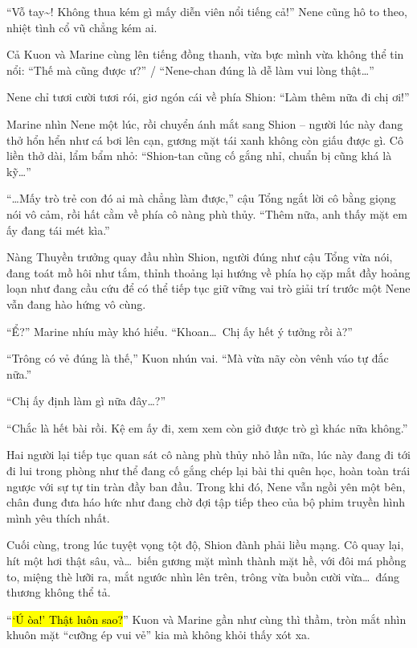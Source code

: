 \documentclass[../main.tex]{subfiles}
\begin{document}
``Vỗ tay\~{}! Không thua kém gì mấy diễn viên nổi tiếng cả!'' Nene cũng hô to theo, nhiệt tình cổ vũ chẳng kém ai.

Cả Kuon và Marine cùng lên tiếng đồng thanh, vừa bực mình vừa không thể tin nổi: ``Thế mà cũng được ư?'' / ``Nene-chan đúng là dễ làm vui lòng thật\dots''

Nene chỉ tươi cười tươi rói, giơ ngón cái về phía Shion: ``Làm thêm nữa đi chị ơi!''

Marine nhìn Nene một lúc, rồi chuyển ánh mắt sang Shion – người lúc này đang thở hổn hển như cá bơi lên cạn, gương mặt tái xanh không còn giấu được gì. Cô liền thở dài, lẩm bẩm nhỏ: ``Shion-tan cũng cố gắng nhỉ, chuẩn bị cũng khá là kỹ\dots''

``\dots Mấy trò trẻ con đó ai mà chẳng làm được,'' cậu Tổng ngắt lời cô bằng giọng nói vô cảm, rồi hất cằm về phía cô nàng phù thủy. ``Thêm nữa, anh thấy mặt em ấy đang tái mét kìa.''

Nàng Thuyền trưởng quay đầu nhìn Shion, người đúng như cậu Tổng vừa nói, đang toát mồ hôi như tắm, thỉnh thoảng lại hướng về phía họ cặp mắt đầy hoảng loạn như đang cầu cứu để có thể tiếp tục giữ vững vai trò giải trí trước một Nene vẫn đang hào hứng vô cùng.

``Ể?'' Marine nhíu mày khó hiểu. ``Khoan\dots\ Chị ấy hết ý tưởng rồi à?''

``Trông có vẻ đúng là thế,'' Kuon nhún vai. ``Mà vừa nãy còn vênh váo tự đắc nữa.''

``Chị ấy định làm gì nữa đây\dots?''

``Chắc là hết bài rồi. Kệ em ấy đi, xem xem còn giở được trò gì khác nữa không.''

Hai người lại tiếp tục quan sát cô nàng phù thủy nhỏ lần nữa, lúc này đang đi tới đi lui trong phòng như thể đang cố gắng chép lại bài thi quên học, hoàn toàn trái ngược với sự tự tin tràn đầy ban đầu. Trong khi đó, Nene vẫn ngồi yên một bên, chân đung đưa háo hức như đang chờ đợi tập tiếp theo của bộ phim truyền hình mình yêu thích nhất.


Cuối cùng, trong lúc tuyệt vọng tột độ, Shion đành phải liều mạng. Cô quay lại, hít một hơi thật sâu, và\dots\ biến gương mặt mình thành mặt hề, với đôi má phồng to, miệng thè lưỡi ra, mắt ngước nhìn lên trên, trông vừa buồn cười vừa\dots\ đáng thương không thể tả.


``\hl{`Ú òa!' Thật luôn sao?}'' Kuon và Marine gần như cùng thì thầm, tròn mắt nhìn khuôn mặt ``cưỡng ép vui vẻ'' kia mà không khỏi thấy xót xa.
\end{document}
